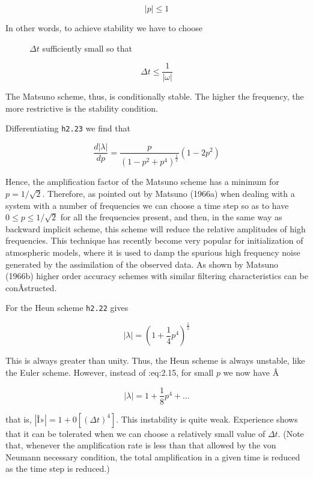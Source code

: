 \[| p | \leq 1\]

\begin{description}
    \item[In other words, to achieve stability we have to choose]
    \(\Delta t\) sufficiently small so that
\end{description}

\[\Delta t \leq \frac{1}{| \omega |}\]

The Matsuno scheme, thus, is conditionally stable. The higher the
frequency, the more restrictive is the stability condition.

Differentiating \texttt{h2.23} we find that

\[\frac{d |\lambda|}{d p} = \frac{p}{( 1 - p^2 + p^4 )^{\frac{1}{2}} } ( 1 - 2 p^2 )\]

Hence, the amplification factor of the Matsuno scheme has a minimum for
\(p = 1/\sqrt{2}\). Therefore, as pointed out by Matsuno (1966a) when
dealing with a system with a number of frequencies we can choose a time
step so as to have \(0 \leq p \leq 1/\sqrt{2}\) for all the frequencies
present, and then, in the same way as backward implicit scheme, this
scheme will reduce the relative amplitudes of high frequencies. This
technique has recently become very popular for initialization of
atmospheric models, where it is used to damp the spurious high frequency
noise generated by the assimilation of the observed data. As shown by
Matsuno (1966b) higher order accuracy schemes with similar filtering
characteristics can be conÂ­structed.

For the Heun scheme \texttt{h2.22} gives

\[| \lambda | = \left( 1 + \frac{1}{4}p^{4} \right)^{\frac{1}{2}}\]

This is always greater than unity. Thus, the Heun scheme is always
unstable, like the Euler scheme. However, instead of :eq:2.15, for small
\(p\) we now have Â­

\[| \lambda | = 1 + \frac{1}{8}p^{4} + \ldots\]

that is,
\(\left| \text{Î»} \right| = 1 + 0\left\lbrack \left( \Delta t \right)^{4} \right\rbrack\).
This instability is quite weak. Experience shows that it can be
tolerated when we can choose a relatively small value of \(\Delta t\).
(Note that, whenever the amplification rate is less than that allowed by
the von Neumann necessary condition, the total amplification in a given
time is reduced as the time step is reduced.)

